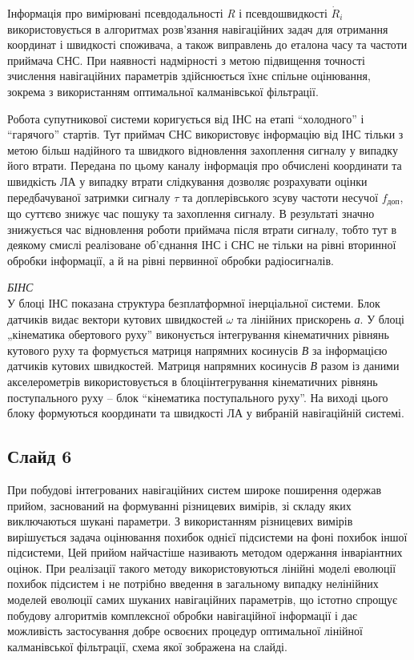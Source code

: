 \documentclass[ukrainian,utf8,simple,floatsubsection, hpadding=1mm,equationsubsection,12pt]{eskdtext}
\begin{document}
Інформація про вимірювані псевдодальності \textit{R} і псевдошвидкості $\dot{R}_{i} $ використовується в алгоритмах розв'язання навігаційних задач для отримання координат і швидкості споживача, а також виправлень до еталона часу та частоти приймача СНС. При наявності надмірності з метою підвищення точності зчислення навігаційних параметрів здійснюється їхнє спільне оцінювання, зокрема з використанням оптимальної калманівської  фільтрації. 

Робота супутникової системи коригується від ІНС на етапі ``холодного'' і ``гарячого'' 
стартів. Тут приймач СНС використовує інформацію від ІНС тільки з метою 
більш надійного та швидкого відновлення захоплення сигналу у випадку його втрати. Передана по цьому 
каналу інформація про обчислені координати та швидкість ЛА у випадку втрати слідкування 
дозволяє розрахувати оцінки передбачуваної затримки сигналу $\tau$ та доплерівського 
зсуву частоти несучої $f_{\text{доп}}$, що суттєво знижує час пошуку та захоплення сигналу. 
В результаті значно знижується час відновлення роботи приймача після втрати сигналу, тобто тут в деякому смислі реалізоване об'єднання ІНС і СНС не тільки на рівні вторинної обробки інформації, а й на рівні 
первинної обробки радіосигналів. 

\textit{БІНС}\\
У блоці ІНС  показана структура безплатформної інерціальної системи. Блок датчиків видає вектори кутових  швидкостей $\omega$ та лінійних прискорень \textit{а}. У блоці „кінематика обертового руху'' виконується інтегрування кінематичних рівнянь кутового руху та формується матриця напрямних косинусів \textit{В} за інформацією датчиків кутових швидкостей. Матриця напрямних косинусів \textit{В} разом із даними акселерометрів використовується в блоціінтегрування кінематичних рівнянь поступального руху -- блок ``кінематика поступального руху''. На виході цього блоку формуються координати та швидкості ЛА у вибраній навігаційній системі.


\subsection*{Слайд 6}

При побудові інтегрованих  навігаційних систем широке поширення одержав прийом, 
заснований на формуванні різницевих вимірів, зі складу яких виключаються шукані 
параметри. З використанням різницевих вимірів  вирішується задача оцінювання 
похибок однієї підсистеми на фоні похибок іншої підсистеми, Цей прийом  найчастіше 
називають методом одержання інваріантних оцінок. При реалізації такого методу 
використовуються лінійні моделі еволюції похибок підсистем  і не потрібно введення 
в загальному випадку нелінійних моделей еволюції самих шуканих навігаційних параметрів, 
що істотно спрощує побудову алгоритмів комплексної обробки навігаційної інформації і 
дає можливість застосування добре освоєних процедур оптимальної  лінійної калманівської 
фільтрації, схема якої зображена на слайді. 
\end{document}

